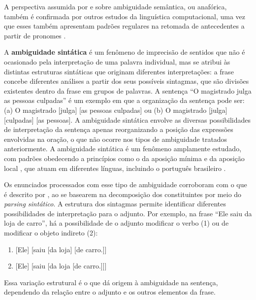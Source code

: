 A perspectiva assumida por \cite{canccado2005manual} e \cite{chomsky1981lectures} sobre ambiguidade semântica, ou anafórica, também é confirmada por outros estudos da linguística computacional, uma vez que esses também apresentam padrões regulares na retomada de antecedentes a partir de pronomes \cite{bruscato2021resoluccao,nogueira2014resoluccao,godoy2020efeitos,de2023interpretaccao}.


A \textbf{ambiguidade sintática} é um fenômeno de imprecisão de sentidos que não é ocasionado pela interpretação de uma palavra individual, mas se atribui às distintas estruturas sintáticas que originam diferentes interpretações: a frase concebe diferentes análises a partir dos seus possíveis sintagmas, que são divisões existentes dentro da frase em grupos de palavras. A sentença ``O magistrado julga as pessoas culpadas'' é um exemplo em que a organização da sentença pode ser: (a) O magistrado [julga] [as pessoas culpadas] ou (b) O magistrado [julga] [culpadas] [as pessoas]. A ambiguidade sintática envolve as diversas possibilidades de interpretação da sentença apenas reorganizando a posição das expressões envolvidas na oração, o que não ocorre nos tipos de ambiguidade tratados anteriormente. A ambiguidade sintática é um fenômeno amplamente estudado, com padrões obedecendo a princípios como o da aposição mínima e da aposição local \cite{maiadimensoes}, que atuam em diferentes línguas, incluindo o português brasileiro \cite{maia2003processamento,maia2004compreensao,brito2013processamento, machado1996sintaxe}. 

Os enunciados processados com esse tipo de ambiguidade corroboram com o que é descrito por \cite{jurafsky2000speech}, ao se basearem na decomposição dos constituintes por meio do \textit{parsing sintático}. A estrutura dos sintagmas permite identificar diferentes possibilidades de interpretação para o adjunto. Por exemplo, na frase \enquote{Ele saiu da loja de carro}, há a possibilidade de o adjunto modificar o verbo (1) ou de modificar o objeto indireto (2):
\begin{enumerate}
    \item {[Ele] [saiu [da loja] [de carro.]]}
    \item {[Ele] [saiu [da loja [de carro.]]]}
\end{enumerate}

Essa variação estrutural é o que dá origem à ambiguidade na sentença, dependendo da relação entre o adjunto e os outros elementos da frase.



